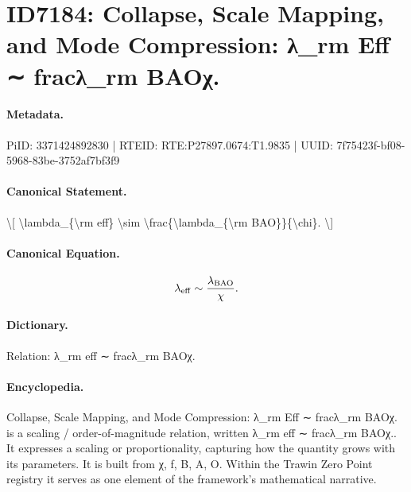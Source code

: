 \section*{ID7184: Collapse, Scale Mapping, and Mode Compression: λ\_rm Eff ∼ fracλ\_rm BAOχ.}
\paragraph{Metadata.}
PiID: 3371424892830 | RTEID: RTE:P27897.0674:T1.9835 | UUID: 7f75423f-bf08-5968-83be-3752af7bf3f9

\paragraph{Canonical Statement.}
\textbackslash{}[ \textbackslash{}lambda\_\{\textbackslash{}rm eff\} \textbackslash{}sim \textbackslash{}frac\{\textbackslash{}lambda\_\{\textbackslash{}rm BAO\}\}\{\textbackslash{}chi\}. \textbackslash{}]

\paragraph{Canonical Equation.}
\[
\lambda_{\rm eff} \sim \frac{\lambda_{\rm BAO}}{\chi}.
\]

\paragraph{Dictionary.}
Relation: λ\_rm eff ∼ fracλ\_rm BAOχ.

\paragraph{Encyclopedia.}
Collapse, Scale Mapping, and Mode Compression: λ\_rm Eff ∼ fracλ\_rm BAOχ. is a scaling / order-of-magnitude relation, written λ\_rm eff ∼ fracλ\_rm BAOχ.. It expresses a scaling or proportionality, capturing how the quantity grows with its parameters. It is built from χ, f, B, A, O. Within the Trawin Zero Point registry it serves as one element of the framework's mathematical narrative.
